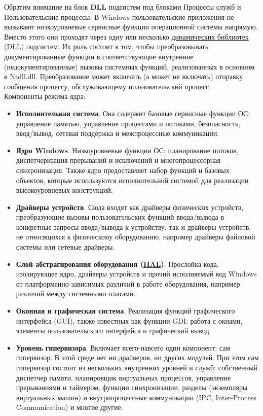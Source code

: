 \documentclass[14pt, a4paper]{article}
\begin{document}
Обратим внимание на блок \textbf{DLL} подсистем под блоками Процессы служб и Пользовательские процессы.
В Windows пользовательские приложения не вызывают низкоуровневые сервисные функции операционной
системы напрямую. Вместо этого они проходят через одну или несколько \underline{динамических библиотек
(DLL)} подсистем. Их роль состоит в том, чтобы преобразовывать документированные функции в
соответствующие внутренние (недокументированные) вызовы системных функций, реализованных в
основном в Ntdll.dll. Преобразование может включать (а может не включать) отправку сообщения
процессу, обслуживающему пользовательский процесс.\\


Компоненты режима ядра:
\begin{itemize}
    \item \textbf{Исполнительная система}. Она содержит базовые сервисные функции
    ОС: управление памятью, управление процессами и потоками, безопасность,
    ввод/вывод, сетевая поддержка и межпроцессные коммуникации.

    \item \textbf{Ядро Windows}. Низкоуровневые функции ОС: планирование потоков,
    диспетчеризация прерываний и исключений и многопроцессорная синхронизация.
    Также ядро предоставляет набор функций и базовых объектов, которые используются
    исполнительной системой для реализации высокоуровневых конструкций.

    \item \textbf{Драйверы устройств}. Сюда входят как драйверы физических устройств,
    преобразующие вызовы пользовательских функций ввода/вывода в конкретные запросы
    ввода/вывода к устройству, так и драйверы устройств, не относящихся к
    физическому оборудованию, например драйверы файловой системы или сетевые драйверы.

    \item \textbf{Слой абстрагирования оборудования (\underline{HAL})}. Прослойка кода, изолирующее ядро,
    драйверы устройств и прочий исполняемый код Windows от платформенно-зависимых различий
    в работе оборудования, например различий между системными платами.

    \item \textbf{Оконная и графическая система}. Реализация функций графического интерфейса (GUI),
    также известных как функции GDI: работа с окнами, элементы пользовательского интерфейса и графический вывод.

    \item \textbf{Уровень гипервизора}. Включает всего-навсего один компонент:
    сам гипервизор. В этой среде нет ни драйверов, ни других модулей.
    При этом сам гипервизор состоит из нескольких внутренних уровней и служб:
    собственный диспетчер памяти, планировщик виртуальных процессов, управление
    прерываниями и таймером, функции синхронизации, разделы
    (экземпляры виртуальных машин) и внутрипроцессные коммуникации
    (IPC, Inter-Process Communication) и многие другие.
\end{itemize}
\end{document}
